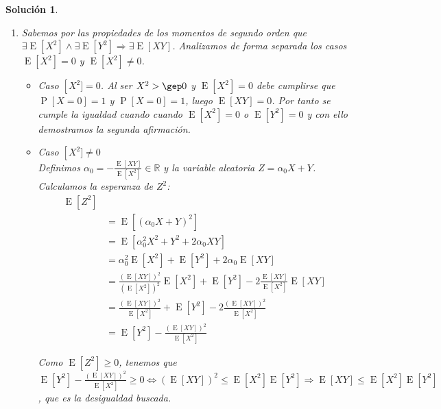\documentclass[
  a4paper,
  spanish,
  12pt,
]{scrartcl}
\theoremstyle{ejercicio-style}
\theoremstyle{remark-style}
\newtheorem*{sol}{Solución}
\begin{document}
\begin{sol}
  \begin{enumerate}
    \\
  	\item Sabemos por las propiedades de los momentos de segundo orden que \(\exists \operatorname{E}[X^2] \wedge \exists \operatorname{E}[Y^2] \Rightarrow \exists \operatorname{E}[XY]\). Analizamos de forma separada los casos \(\operatorname{E}[X^2] = 0\) y \(\operatorname{E}[X^2] \neq 0\).
  	  \begin{itemize}
  	    \item Caso \(\operatorname[X^2] = 0\). Al ser \(X^2 > \gep 0\) y \(\operatorname{E}[X^2] = 0\) debe cumplirse que \(\operatorname{P}[X=0] = 1\) y \(\operatorname{P}[X=0] = 1\), luego \(\operatorname{E}[XY]=0\). Por tanto se cumple la igualdad cuando cuando \(\operatorname{E}[X^2] = 0\) o \(\operatorname{E}[Y^2] = 0\) y con ello demostramos la segunda afirmación.
  	    
  	    \item Caso \(\operatorname[X^2] \neq 0\) \\
  	      Definimos \(\alpha_0 = -\frac{\operatorname{E}[XY]}{\operatorname{E}[X^2]} \in \mathbb{R}\) y la variable aleatoria \(Z=\alpha_0 X + Y\). \\
  	      Calculamos la esperanza de \(Z^2\):
  	      \begin{align*}
  	        \operatorname{E}[Z^2] \\ 
  	        &= \operatorname{E}[(\alpha_0 X + Y)^2] \\
  	        &= \operatorname{E}[\alpha_0^2 X^2 + Y^2 + 2\alpha_0 X Y] \\ 
  	        &= \alpha_0^2 \operatorname{E}[X^2] + \operatorname{E}[Y^2] + 2 \alpha_0 \operatorname{E}[XY] \\
  	        &= \frac{(\operatorname{E}[XY])^2}{(\operatorname{E}[X^2])^2} \operatorname{E}[X^2] + \operatorname{E}[Y^2] - 2\frac{\operatorname{E}[XY]}{\operatorname{E}[X^2]} \operatorname{E}[XY] \\
  	        &= \frac{(\operatorname{E}[XY])^2}{\operatorname{E}[X^2]} + \operatorname{E}[Y^2] - 2\frac{(\operatorname{E}[XY])^2}{\operatorname{E}[X^2]} \\
  	        &= \operatorname{E}[Y^2] - \frac{(\operatorname{E}[XY])^2}{\operatorname{E}[X^2]}
  	      \end{align*}
  	      
  	      Como \(\operatorname{E}[Z^2] \geq 0\), tenemos que \(\operatorname{E}[Y^2] - \frac{(\operatorname{E}[XY])^2}{\operatorname{E}[X^2]} \geq 0 \Leftrightarrow (\operatorname{E}[XY])^2 \leq \operatorname{E}[X^2] \operatorname{E}[Y^2] \Rightarrow \operatorname{E}[XY] \leq \operatorname{E}[X^2] \operatorname{E}[Y^2]\), que es la desigualdad buscada.
  	    

\end{itemize}
\end{enumerate}
\end{sol}
\end{document}
